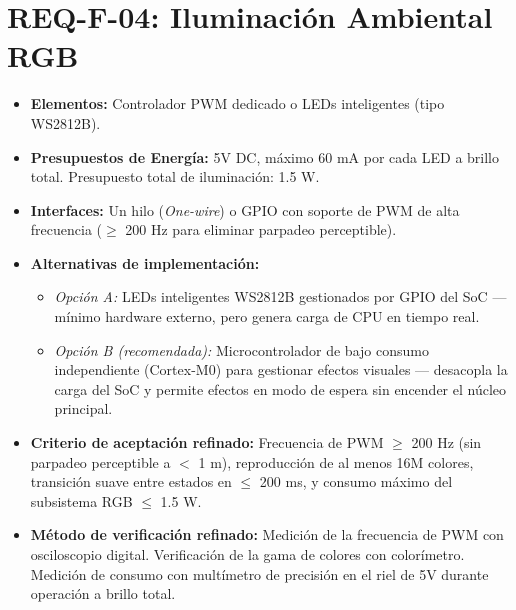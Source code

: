 \documentclass[%
	paper=a4,
	twoside=false,
	parskip=half,
	chapterprefix=false,
	10pt,
	headings=normal,
	bibliography=totoc,
	listof=totoc,
	titlepage=on,
	captions=tableabove,
	draft=false,
]{scrbook}%
\begin{document}
\section{REQ-F-04: Iluminación Ambiental RGB}
\begin{itemize}
    \item \textbf{Elementos:} Controlador PWM dedicado o LEDs inteligentes (tipo WS2812B).
    \item \textbf{Presupuestos de Energía:} 5V DC, máximo 60 mA por cada LED a brillo total. Presupuesto total de iluminación: 1.5 W.
    \item \textbf{Interfaces:} Un hilo (\textit{One-wire}) o GPIO con soporte de PWM de alta frecuencia ($\geq$ 200 Hz para eliminar parpadeo perceptible).
    \item \textbf{Alternativas de implementación:}
        \begin{itemize}
            \item \textit{Opción A:} LEDs inteligentes WS2812B gestionados por GPIO del SoC — mínimo hardware externo, pero genera carga de CPU en tiempo real.
            \item \textit{Opción B (recomendada):} Microcontrolador de bajo consumo independiente (Cortex-M0) para gestionar efectos visuales — desacopla la carga del SoC y permite efectos en modo de espera sin encender el núcleo principal.
        \end{itemize}
    \item \textbf{Criterio de aceptación refinado:} Frecuencia de PWM $\geq$ 200 Hz (sin parpadeo perceptible a $<$ 1 m), reproducción de al menos 16M colores, transición suave entre estados en $\leq$ 200 ms, y consumo máximo del subsistema RGB $\leq$ 1.5 W.
    \item \textbf{Método de verificación refinado:} Medición de la frecuencia de PWM con osciloscopio digital. Verificación de la gama de colores con colorímetro. Medición de consumo con multímetro de precisión en el riel de 5V durante operación a brillo total.
\end{itemize}

\end{document}
